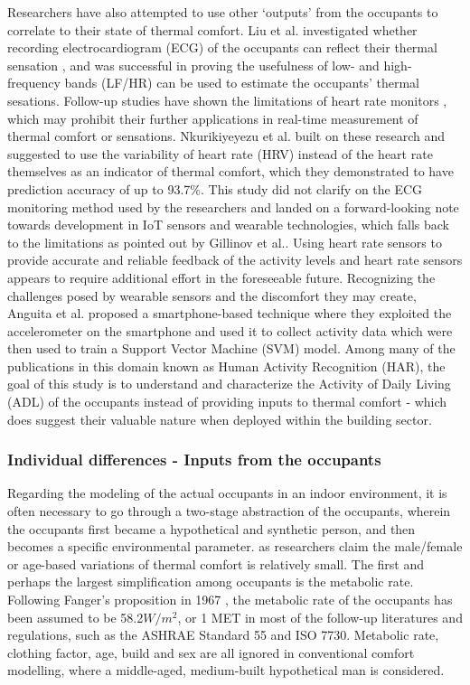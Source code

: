 	Researchers have also attempted to use other `outputs' from the occupants to correlate to their state of thermal comfort. Liu et al. investigated whether recording electrocardiogram (ECG) of the occupants can reflect their thermal sensation \cite{liu_heart_2008}, and was successful in proving the usefulness of low- and high-frequency bands (LF/HR) can be used to estimate the occupants' thermal sesations. Follow-up studies have shown the limitations of heart rate monitors \cite{gillinov_variable_2017}, which may prohibit their further applications in real-time measurement of thermal comfort or sensations. Nkurikiyeyezu et al. built on these research and suggested to use the variability of heart rate (HRV) instead of the heart rate themselves as an indicator of thermal comfort, which they demonstrated to have prediction accuracy of up to 93.7\%. This study did not clarify on the ECG monitoring method used by the researchers and landed on a forward-looking note towards development in IoT sensors and wearable technologies, which falls back to the limitations as pointed out by Gillinov et al.\cite{gillinov_variable_2017}. Using heart rate sensors to provide accurate and reliable feedback of the activity levels and heart rate sensors appears to require additional effort in the foreseeable future. 
	Recognizing the challenges posed by wearable sensors and the discomfort they may create, Anguita et al. proposed a smartphone-based technique where they exploited the accelerometer on the smartphone and used it to collect activity data which were then used to train a Support Vector Machine (SVM) model. Among many of the publications in this domain known as Human Activity Recognition (HAR), the goal of this study is to understand and characterize the Activity of Daily Living (ADL) of the occupants instead of providing inputs to thermal comfort - which does suggest their valuable nature when deployed within the building sector. 

\subsubsection{Individual differences - Inputs from the occupants}
	Regarding the modeling of the actual occupants in an indoor environment, it is often necessary to go through a two-stage abstraction of the occupants, wherein the occupants first became a hypothetical and synthetic person, and then becomes a specific environmental parameter.  as researchers claim the male/female or age-based variations of thermal comfort is relatively small. 
	The first and perhaps the largest simplification among occupants is the metabolic rate. Following Fanger's proposition in 1967 \cite{fanger_calculation_1967}, the metabolic rate of the occupants has been assumed to be 58.2$W/m^2$, or 1 MET in most of the follow-up literatures and regulations, such as the ASHRAE Standard 55\cite{ashrae_ansi/ashrae_2013} and ISO 7730\cite{iso_iso_2005}.
    Metabolic rate, clothing factor, age, build and sex are all ignored in conventional comfort modelling, where a middle-aged, medium-built hypothetical man is considered.

